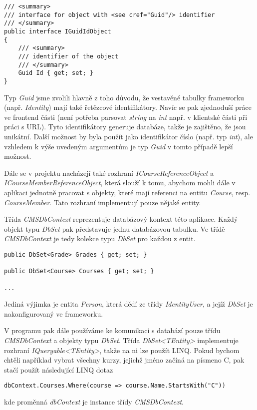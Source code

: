 \begin{lstlisting}
/// <summary>
/// interface for object with <see cref="Guid"/> identifier
/// </summary>
public interface IGuidIdObject
{
	/// <summary>
	/// identifier of the object
	/// </summary>
	Guid Id { get; set; }
}
\end{lstlisting}


Typ \textit{Guid} jsme zvolili hlavně z toho důvodu, že vestavěné tabulky frameworku (např. \textit{Identity}) mají také řetězcové identifikátory. Navíc se pak zjednoduší práce ve frontend části (není potřeba parsovat \textit{string} na \textit{int} např. v klientské části při práci s URL). Tyto identifikátory generuje databáze, takže je zajištěno, že jsou unikátní.
Další možnost by byla použít jako identifikátor číslo (např. typ \textit{int}), ale vzhledem k výše uvedeným argumentům je typ \textit{Guid} v tomto případě lepší možnost.

Dále se v projektu nacházejí také rozhraní \textit{ICourseReferenceObject} a \textit{ICourseMemberReferenceObject}, která slouží k tomu, abychom mohli dále v aplikaci jednotně pracovat s objekty, které mají referenci na entitu \textit{Course}, resp. \textit{CourseMember}. Tato rozhraní implementují pouze nějaké entity.

Třída \textit{CMSDbContext} reprezentuje databázový kontext této aplikace. Každý objekt typu \textit{DbSet} pak představuje jednu databázovou tabulku. Ve třídě \textit{CMSDbContext} je tedy kolekce typu \textit{DbSet} pro každou z entit.

\begin{lstlisting}
public DbSet<Grade> Grades { get; set; }

public DbSet<Course> Courses { get; set; }

...
\end{lstlisting}

Jediná výjimka je entita \textit{Person}, která dědí ze třídy \textit{IdentityUser}, a jejíž \textit{DbSet} je nakonfigurovaný ve frameworku. 

V programu pak dále používáme ke komunikaci s databází pouze třídu \textit{CMSDbContext} a objekty typu \textit{DbSet}. Třída \textit{DbSet<TEntity>} implementuje rozhraní \textit{IQueryable<TEntity>}, takže na ni lze použít LINQ. Pokud bychom chtěli například vybrat všechny kurzy, jejichž jméno začíná na písmeno C, pak stačí použít následující LINQ dotaz
\begin{lstlisting}
dbContext.Courses.Where(course => course.Name.StartsWith("C"))
\end{lstlisting}
kde proměnná \textit{dbContext} je instance třídy \textit{CMSDbContext}.

